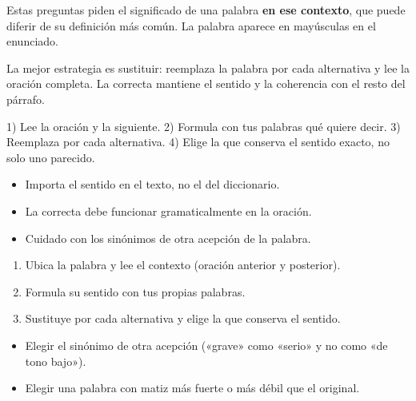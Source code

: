 \documentclass[10pt,a4paper,twocolumn]{article}
\begin{document}
Estas preguntas piden el significado de una palabra \textbf{en ese contexto}, que puede diferir de su definición más común. La palabra aparece en mayúsculas en el enunciado.

La mejor estrategia es sustituir: reemplaza la palabra por cada alternativa y lee la oración completa. La correcta mantiene el sentido y la coherencia con el resto del párrafo.

\begin{definicion}
1) Lee la oración y la siguiente. 2) Formula con tus palabras qué quiere decir. 3) Reemplaza por cada alternativa. 4) Elige la que conserva el sentido exacto, no solo uno parecido.
\end{definicion}

\begin{ideasclave}
\begin{itemize}
  \item Importa el sentido en el texto, no el del diccionario.
  \item La correcta debe funcionar gramaticalmente en la oración.
  \item Cuidado con los sinónimos de otra acepción de la palabra.
\end{itemize}
\end{ideasclave}

\begin{metodo}
\begin{enumerate}
  \item Ubica la palabra y lee el contexto (oración anterior y posterior).
  \item Formula su sentido con tus propias palabras.
  \item Sustituye por cada alternativa y elige la que conserva el sentido.
\end{enumerate}
\end{metodo}

\begin{errorfrecuente}
\begin{itemize}
  \item Elegir el sinónimo de otra acepción («grave» como «serio» y no como «de tono bajo»).
  \item Elegir una palabra con matiz más fuerte o más débil que el original.
\end{itemize}
\end{errorfrecuente}
\end{document}
